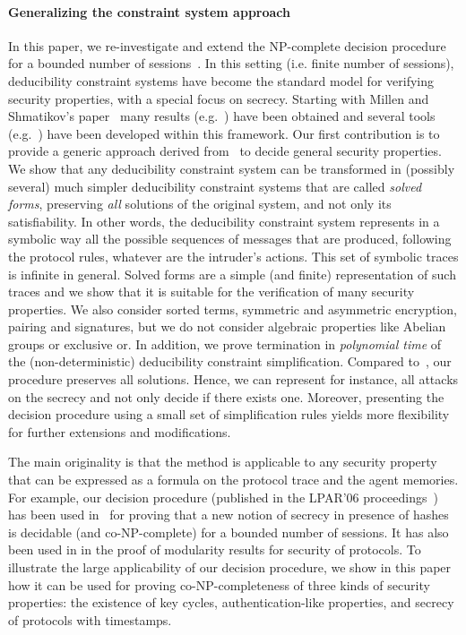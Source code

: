 \documentclass[acmtocl,acmnow]{acmtrans2m}
\newcommand{\dedcons}[1]{deducibility constraint}
\newcommand{\dedsys}[1]{deducibility constraint system}
\newcommand{\dedsyss}[1]{deducibility constraint systems}
\begin{document}
\paragraph{Generalizing the constraint system approach} 
In this paper, we re-investigate and extend the NP-complete decision
procedure for a bounded number of sessions~\cite{RT01}. In this
setting (i.e. finite number of sessions), \dedsyss{} have
become the standard model for verifying security properties, with a
special focus on secrecy. Starting with Millen and Shmatikov's
paper~\cite{MS01} many results
(e.g.~\cite{CS03,BaudetCCS05,BCD-stacs2007}) have been obtained and
several tools (e.g.~\cite{CorinE02}) have been developed within this
framework.  Our first contribution is to provide a generic approach
derived from~\cite{CS03} to decide general security properties. We
show that any \dedsys{} can be transformed in (possibly
several) much simpler \dedsyss{} that are called \emph{solved
forms}, preserving \emph{all} solutions of the original system, and not
only its satisfiability. In other words, the \dedsys{} represents
in a symbolic way all the possible sequences of messages that are
produced, following the protocol rules, whatever are the intruder's actions.
This set of symbolic traces is infinite in general. Solved forms
are a simple (and finite) representation of such traces and we show that it is
suitable for the verification of many security properties. 
We also consider sorted terms, symmetric and asymmetric encryption, pairing and
signatures, but we do not consider algebraic properties like Abelian
groups or exclusive or.  In addition, we prove termination in
\emph{polynomial time} of the (non-deterministic) \dedcons{} simplification.
Compared to~\cite{RT01}, our procedure preserves all solutions. Hence,
we can represent for instance, all attacks on the secrecy and not
only decide if there exists one. Moreover,
presenting the decision procedure using a
small set of simplification rules yields more flexibility
for further extensions and modifications.

The main originality is that the method is applicable to any security
property that can be expressed as a formula on the protocol trace
and the agent memories.  For example, our decision procedure
(published in the LPAR'06 proceedings~\cite{CortierLPAR06}) has been
used in~\cite{CKKW-fsttcs2006} for proving that a new notion of
secrecy in presence of hashes is decidable (and co-NP-complete) for a
bounded number of sessions. It has also been used in \cite{cortier07fsttcs}
in the proof of modularity results for security of protocols.
To illustrate the large applicability of
our decision procedure, we show in this paper how it can be used for
proving co-NP-completeness of three kinds of security properties: the
existence of key cycles, authentication-like properties, and secrecy of
protocols with timestamps.
\end{document}
